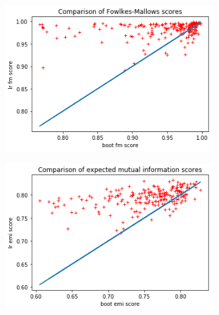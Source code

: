 \documentclass[a4paper]{article}
\begin{document}
\begin{figure}[h!]
	\centering
  \begin{subfigure}[t]{0.4\textwidth}
		\includegraphics[width = \textwidth]{./data_sens_figs/compare_fm_score.png}
		\subcaption{}
	\end{subfigure}
  \begin{subfigure}[t]{0.4\textwidth}
    \includegraphics[width = \textwidth]{./data_sens_figs/compare_emi_score.png}
    \subcaption{}
  \end{subfigure}\\
	\begin{subfigure}[t]{0.4\textwidth}

\end{subfigure}
\end{figure}
\end{document}
